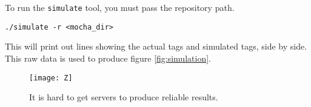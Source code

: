 To run the {\tt simulate} tool, you must pass the repository path.

\begin{center}
  {\tt ./simulate -r <mocha\_dir>}
\end{center}
This will print out lines showing the actual tags and simulated tags,
side by side. This raw data is used to produce figure \ref{fig:simulation}.

\begin{figure}
\centering
\texttt{[image: Z]}
\caption{It is hard to get servers to produce reliable results.}
\label{fig:doge}
\end{figure}
